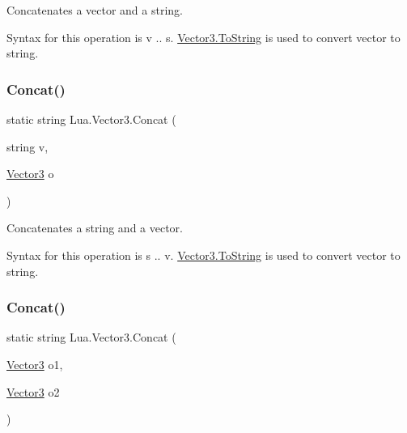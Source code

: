Concatenates a vector and a string. 

Syntax for this operation is {\ttfamily v .. s}. \mbox{\hyperlink{class_lua_1_1_vector3_a63129be99b82f76bb94c8267b0dcd692}{Vector3.\+To\+String}} is used to convert vector to string. \mbox{\label{class_lua_1_1_vector3_a185d18054534f55a4ce5f951e157df96}} 
\subsubsection{\texorpdfstring{Concat()}{Concat()}\hspace{0.1cm}{\footnotesize\ttfamily [2/3]}}
{\footnotesize\ttfamily static string Lua.\+Vector3.\+Concat (\begin{DoxyParamCaption}\item[{string}]{v,  }\item[{\mbox{\hyperlink{class_lua_1_1_vector3}{Vector3}}}]{o }\end{DoxyParamCaption})\hspace{0.3cm}{\ttfamily [static]}}



Concatenates a string and a vector. 

Syntax for this operation is {\ttfamily s .. v}. \mbox{\hyperlink{class_lua_1_1_vector3_a63129be99b82f76bb94c8267b0dcd692}{Vector3.\+To\+String}} is used to convert vector to string. \mbox{\label{class_lua_1_1_vector3_aa50462b9cd533a0b1216975d52940d5a}} 
\subsubsection{\texorpdfstring{Concat()}{Concat()}\hspace{0.1cm}{\footnotesize\ttfamily [3/3]}}
{\footnotesize\ttfamily static string Lua.\+Vector3.\+Concat (\begin{DoxyParamCaption}\item[{\mbox{\hyperlink{class_lua_1_1_vector3}{Vector3}}}]{o1,  }\item[{\mbox{\hyperlink{class_lua_1_1_vector3}{Vector3}}}]{o2 }\end{DoxyParamCaption})\hspace{0.3cm}{\ttfamily [static]}}



